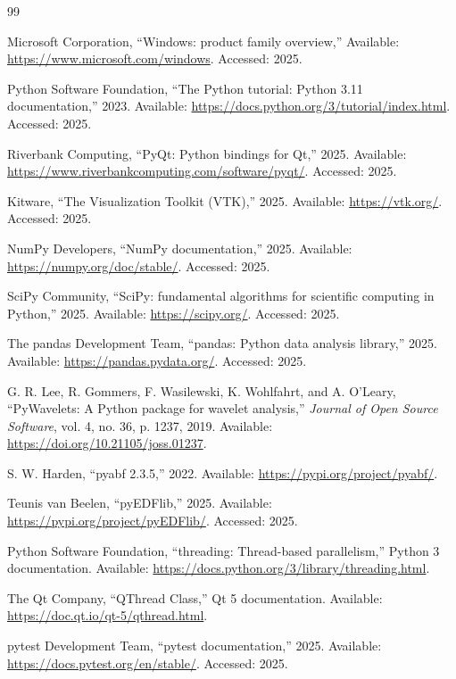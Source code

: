 \documentclass[12pt, letterpaper]{article}
\begin{document}
\begin{thebibliography}{99}

Microsoft Corporation, ``Windows: product family overview,'' Available: \url{https://www.microsoft.com/windows}. Accessed: 2025.

Python Software Foundation, ``The Python tutorial: Python 3.11 documentation,'' 2023. Available: \url{https://docs.python.org/3/tutorial/index.html}. Accessed: 2025.

Riverbank Computing, ``PyQt: Python bindings for Qt,'' 2025. Available: \url{https://www.riverbankcomputing.com/software/pyqt/}. Accessed: 2025.

Kitware, ``The Visualization Toolkit (VTK),'' 2025. Available: \url{https://vtk.org/}. Accessed: 2025.

NumPy Developers, ``NumPy documentation,'' 2025. Available: \url{https://numpy.org/doc/stable/}. Accessed: 2025.

SciPy Community, ``SciPy: fundamental algorithms for scientific computing in Python,'' 2025. Available: \url{https://scipy.org/}. Accessed: 2025.

The pandas Development Team, ``pandas: Python data analysis library,'' 2025. Available: \url{https://pandas.pydata.org/}. Accessed: 2025.

G. R. Lee, R. Gommers, F. Wasilewski, K. Wohlfahrt, and A. O'Leary, ``PyWavelets: A Python package for wavelet analysis,'' \textit{Journal of Open Source Software}, vol. 4, no. 36, p. 1237, 2019. Available: \url{https://doi.org/10.21105/joss.01237}.

S. W. Harden, ``pyabf 2.3.5,'' 2022. Available: \url{https://pypi.org/project/pyabf/}.

Teunis van Beelen, ``pyEDFlib,'' 2025. Available: \url{https://pypi.org/project/pyEDFlib/}. Accessed: 2025.

Python Software Foundation, ``threading: Thread-based parallelism,'' Python 3 documentation. Available: \url{https://docs.python.org/3/library/threading.html}.

The Qt Company, ``QThread Class,'' Qt 5 documentation. Available: \url{https://doc.qt.io/qt-5/qthread.html}.

pytest Development Team, ``pytest documentation,'' 2025. Available: \url{https://docs.pytest.org/en/stable/}. Accessed: 2025.


\end{thebibliography}
\end{document}
